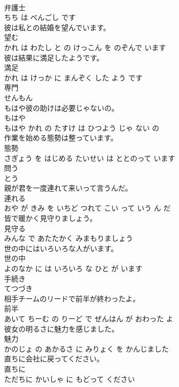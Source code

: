 \documentclass[8pt]{extreport}
\begin{document}
\begin{CJK}{UTF8}{min}
\\	弁護士 
\\	ちち は べんごし です			
\\	彼は私との結婚を望んでいます。	
\\	望む 
\\	かれ は わたし と の けっこん を のぞんで います			
\\	彼は結果に満足したようです。	
\\	満足 
\\	かれ は けっか に まんぞく した よう です			
\\	専門	
\\	せんもん		
\\	もはや彼の助けは必要じゃないの。	
\\	もはや 
\\	もはや かれ の たすけ は ひつよう じゃ ない の			
\\	作業を始める態勢は整っています。	
\\	態勢 
\\	さぎょう を はじめる たいせい は ととのって います			
\\	問う	
\\	とう		
\\	親が君を一度連れて来いって言うんだ。	
\\	連れる 
\\	おや が きみ を いちど つれて こい って いう ん だ			
\\	皆で暖かく見守りましょう。	
\\	見守る 
\\	みんな で あたたかく みまもりましょう			
\\	世の中にはいろいろな人がいます。	
\\	世の中 
\\	よのなか に は いろいろ な ひと が います			
\\	手続き	
\\	てつづき		
\\	相手チームのリードで前半が終わったよ。	
\\	前半 
\\	あいて ちーむ の りーど で ぜんはん が おわった よ			
\\	彼女の明るさに魅力を感じました。	
\\	魅力 
\\	かのじょ の あかるさ に みりょく を かんじました			
\\	直ちに会社に戻ってください。	
\\	直ちに 
\\	ただちに かいしゃ に もどって ください			

\end{CJK}
\end{document}
